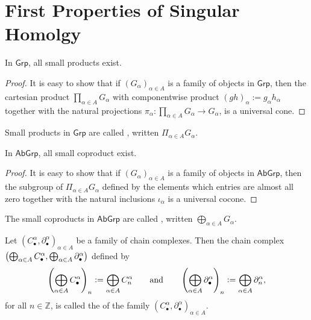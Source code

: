 \section*{First Properties of Singular Homolgy}

\begin{proposition}
	In $\mathsf{Grp}$, all small products exist.
\end{proposition}

\begin{proof}
	It is easy to show that if $(G_\alpha)_{\alpha \in A}$ is a family of objects in $\mathsf{Grp}$, then the cartesian product $\prod_{\alpha \in A}G_\alpha$ with componentwise product $(gh)_\alpha := g_\alpha h_\alpha$ together with the natural projections $\pi_\alpha : \prod_{\alpha \in A} G_\alpha \to G_\alpha$, is a universal cone.
\end{proof}

\begin{definition}
	Small products in $\mathsf{Grp}$ are called , written $\Pi_{\alpha \in A} G_\alpha$.
\end{definition}

\begin{proposition}
	In $\mathsf{AbGrp}$, all small coproduct exist.
\end{proposition}

\begin{proof}
	It is easy to show that if $(G_\alpha)_{\alpha \in A}$ is a family of objects in $\mathsf{AbGrp}$, then the subgroup of $\Pi_{\alpha \in A} G_\alpha$ defined by the elements which entries are almost all zero together with the natural inclusions $\iota_\alpha$ is a universal cocone.
\end{proof}

\begin{definition}
	The small coproducts in $\mathsf{AbGrp}$ are called , written $\bigoplus_{\alpha \in A}G_\alpha$.
\end{definition}

\begin{definition}
	Let $(C^\alpha_\bullet,\partial_\bullet^\alpha)_{\alpha \in A}$ be a family of chain complexes. Then the chain complex $\del[1]{\bigoplus_{\alpha \in A}C^\alpha_\bullet, \bigoplus_{\alpha \in A}\partial^\alpha_\bullet}$ defined by
	\begin{equation*}
		\del[4]{\bigoplus_{\alpha \in A}C_\bullet^\alpha}_n := \bigoplus_{\alpha \in A} C_n^\alpha \qquad \text{and} \qquad \del[4]{\bigoplus_{\alpha \in A}\partial_\bullet^\alpha}_n := \bigoplus_{\alpha \in A}\partial_n^\alpha, 
	\end{equation*}
	\noindent for all $n \in \mathbb{Z}$, is called the  of the family $(C_\bullet^\alpha,\partial_\bullet^\alpha)_{\alpha \in A}$.
\end{definition}

